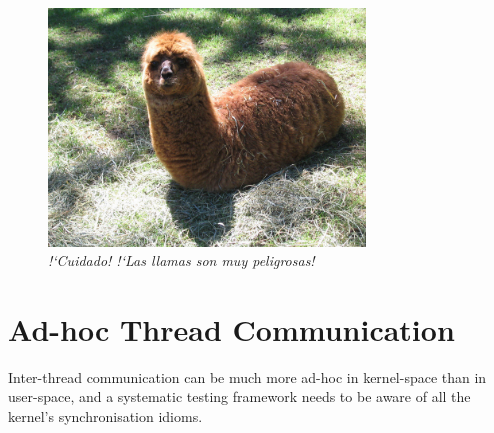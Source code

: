 \begin{figure}[t]
	\begin{center}
	\includegraphics[width=0.75\textwidth]{vip1066720.jpg}
	\end{center}
	\caption{{\em !`Cuidado! !`Las llamas son muy peligrosas!}\cite{de0u}}
\end{figure}

\section{Ad-hoc Thread Communication}

Inter-thread communication can be much more ad-hoc in kernel-space than in user-space\hspace{0in}\cite{datacollider}, and a systematic testing framework needs to be aware of all the kernel's synchronisation idioms.

